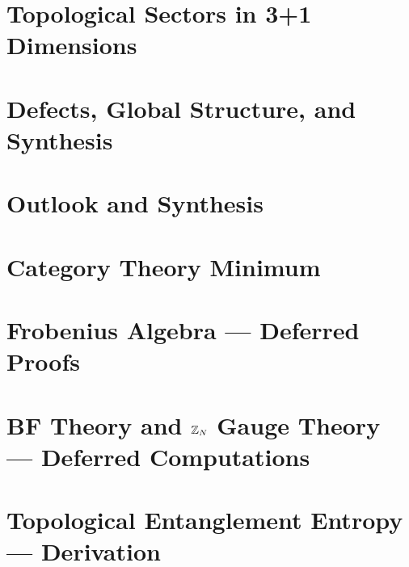 \documentclass[11pt]{report}
\begin{document}
\chapter{Topological Sectors in 3+1 Dimensions}\label{ch:sectors-3plus1d}


\chapter{Defects, Global Structure, and Synthesis}\label{ch:defects-synthesis}


\chapter{Outlook and Synthesis}\label{ch:outlook}



\appendix

\chapter{Category Theory Minimum}\label{app:category-theory}


\chapter{Frobenius Algebra --- Deferred Proofs}\label{app:frobenius-proofs}




\chapter{BF Theory and $\mathbb{Z}_N$ Gauge Theory --- Deferred Computations}


\chapter{Topological Entanglement Entropy --- Derivation}





\end{document}
